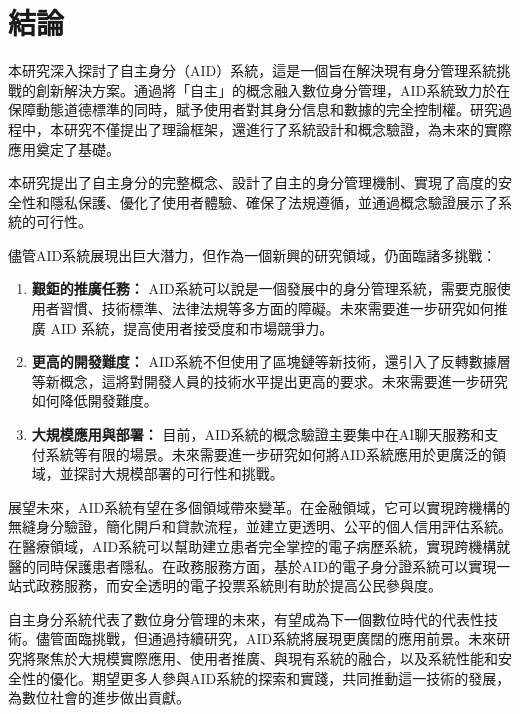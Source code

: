 
\chapter{結論}
本研究深入探討了自主身分（AID）系統，這是一個旨在解決現有身分管理系統挑戰的創新解決方案。通過將「自主」的概念融入數位身分管理，AID系統致力於在保障動態道德標準的同時，賦予使用者對其身分信息和數據的完全控制權。研究過程中，本研究不僅提出了理論框架，還進行了系統設計和概念驗證，為未來的實際應用奠定了基礎。

本研究提出了自主身分的完整概念、設計了自主的身分管理機制、實現了高度的安全性和隱私保護、優化了使用者體驗、確保了法規遵循，並通過概念驗證展示了系統的可行性。

儘管AID系統展現出巨大潛力，但作為一個新興的研究領域，仍面臨諸多挑戰：
\begin{enumerate}
    \item \textbf{艱鉅的推廣任務：} AID系統可以說是一個發展中的身分管理系統，需要克服使用者習慣、技術標準、法律法規等多方面的障礙。未來需要進一步研究如何推廣 AID 系統，提高使用者接受度和市場競爭力。
    \item \textbf{更高的開發難度：} AID系統不但使用了區塊鏈等新技術，還引入了反轉數據層等新概念，這將對開發人員的技術水平提出更高的要求。未來需要進一步研究如何降低開發難度。
    \item \textbf{大規模應用與部署：} 目前，AID系統的概念驗證主要集中在AI聊天服務和支付系統等有限的場景。未來需要進一步研究如何將AID系統應用於更廣泛的領域，並探討大規模部署的可行性和挑戰。
\end{enumerate}

展望未來，AID系統有望在多個領域帶來變革。在金融領域，它可以實現跨機構的無縫身分驗證，簡化開戶和貸款流程，並建立更透明、公平的個人信用評估系統。在醫療領域，AID系統可以幫助建立患者完全掌控的電子病歷系統，實現跨機構就醫的同時保護患者隱私。在政務服務方面，基於AID的電子身分證系統可以實現一站式政務服務，而安全透明的電子投票系統則有助於提高公民參與度。

自主身分系統代表了數位身分管理的未來，有望成為下一個數位時代的代表性技術。儘管面臨挑戰，但通過持續研究，AID系統將展現更廣闊的應用前景。未來研究將聚焦於大規模實際應用、使用者推廣、與現有系統的融合，以及系統性能和安全性的優化。期望更多人參與AID系統的探索和實踐，共同推動這一技術的發展，為數位社會的進步做出貢獻。